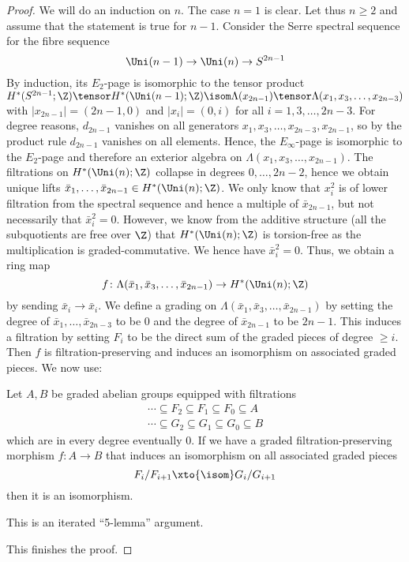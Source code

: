 \begin{proof}
	We will do an induction on $n$.
	The case $n = 1$ is clear.
	Let thus $n \geq 2$ and assume that the statement is true for $n - 1$.
	Consider the Serre spectral sequence for the fibre sequence
	\begin{equation*}
		\Uni(n - 1) \to \Uni(n) \to S^{2n - 1}
	\end{equation*}
	By induction, its $E_2$-page is isomorphic to the tensor product $H^*(S^{2n - 1}; \Z) \tensor H^*(\Uni(n - 1); \Z) \isom \Lambda(x_{2n - 1}) \tensor \Lambda(x_1, x_3, \ldots, x_{2n - 3})$ with $|x_{2n - 1}| = (2n - 1, 0)$ and $|x_i| = (0, i)$ for all $i = 1, 3, \ldots, 2n - 3$.
	For degree reasons, $d_{2n - 1}$ vanishes on all generators $x_1, x_3, \ldots, x_{2n - 3}, x_{2n - 1}$, so by the product rule $d_{2n - 1}$ vanishes on all elements.
	Hence, the $E_\infty$-page is isomorphic to the $E_2$-page and therefore an exterior algebra on $\Lambda(x_1, x_3, \ldots, x_{2n - 1})$.
	The filtrations on $H^*(\Uni(n); \Z)$ collapse in degrees $0, \ldots, 2n - 2$, hence we obtain unique lifts $\bar{x}_1, \ldots, \bar{x}_{2n - 1} \in H^*(\Uni(n); \Z)$.
	We only know that $x_i^2$ is of lower filtration from the spectral sequence and hence a multiple of $\bar{x}_{2n - 1}$, but not necessarily that $\bar{x}_i^2 = 0$.
	However, we know from the additive structure (all the subquotients are free over $\Z$) that $H^*(\Uni(n); \Z)$ is torsion-free as the multiplication is graded-commutative.
	We hence have $\bar{x}_i^2 = 0$.
	Thus, we obtain a ring map
	\begin{equation*}
		f\colon \Lambda(\bar{x}_1, \bar{x}_3, \ldots, \bar{x}_{2n - 1}) \to H^*(\Uni(n); \Z)
	\end{equation*}
	by sending $\bar{x}_i \to \bar{x}_i$.
	We define a grading on $\Lambda(\bar{x}_1, \bar{x}_3, \ldots, \bar{x}_{2n - 1})$ by setting the degree of $\bar{x}_1, \ldots, \bar{x}_{2n - 3}$ to be 0 and the degree of $\bar{x}_{2n - 1}$ to be $2n - 1$.
	This induces a filtration by setting $F_i$ to be the direct sum of the graded pieces of degree $\geq i$. 
	Then $f$ is filtration-preserving and induces an isomorphism on associated graded pieces.
	We now use:
	\begin{lemma}
		Let $A, B$ be graded abelian groups equipped with filtrations
		\begin{gather*}
			\cdots \subseteq F_2 \subseteq F_1 \subseteq F_0 \subseteq A \\
			\cdots \subseteq G_2 \subseteq G_1 \subseteq G_0 \subseteq B
		\end{gather*}
		which are in every degree eventually 0.
		If we have a graded filtration-preserving morphism $f\colon A \to B$ that induces an isomorphism on all associated graded pieces
		\begin{equation*}
			F_i / F_{i + 1} \xto{\isom} G_i / G_{i + 1}
		\end{equation*}
		then it is an isomorphism.
	\end{lemma}
	\begin{smallproof}
		This is an iterated \enquote{5-lemma} argument.
	\end{smallproof}
	This finishes the proof.
\end{proof}
